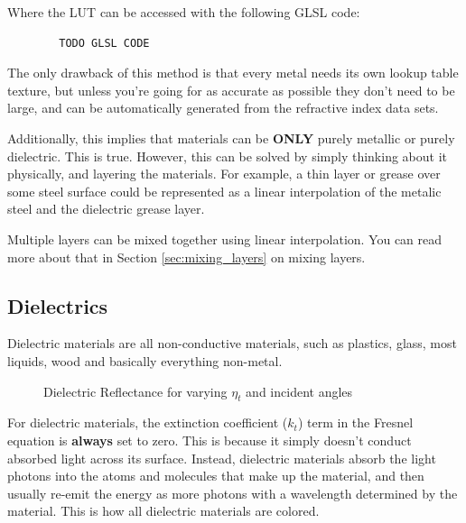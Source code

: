 \documentclass[12pt,letterpaper]{article}
\begin{document}
Where the LUT can be accessed with the following GLSL code:


\begin{lstlisting}
        TODO GLSL CODE
\end{lstlisting}

\newpage

The only drawback of this method is that every metal needs its own lookup table texture, 
but unless you're going for as accurate as possible they don't need to be large, and can be automatically generated from
the refractive index data sets.

Additionally, this implies that materials can be \textbf{ONLY} purely metallic or purely dielectric. This is true. However,
this can be solved by simply thinking about it physically, and layering the materials. For example, a thin layer or grease over 
some steel surface could be represented as a linear interpolation of the metalic steel and the dielectric grease layer.

Multiple layers can be mixed together using linear interpolation. You can read more about that in Section \ref{sec:mixing_layers} on mixing layers.

\subsection{Dielectrics}

Dielectric materials are all non-conductive materials, such as plastics, glass, most liquids, wood and basically everything non-metal.

\begin{figure}[htbp]
    \centering
    \caption{Dielectric Reflectance for varying $\eta_t$ and incident angles}
    \label{fig:dielectric_fresnel}
\end{figure}

For dielectric materials, the extinction coefficient ($k_t$) term in the Fresnel equation is \textbf{always} set to zero. This is because
it simply doesn't conduct absorbed light across its surface. Instead, dielectric materials absorb the light photons into the atoms and molecules that
make up the material, and then usually re-emit the energy as more photons with a wavelength determined by the material. This is how all dielectric materials
are colored.
\end{document}
